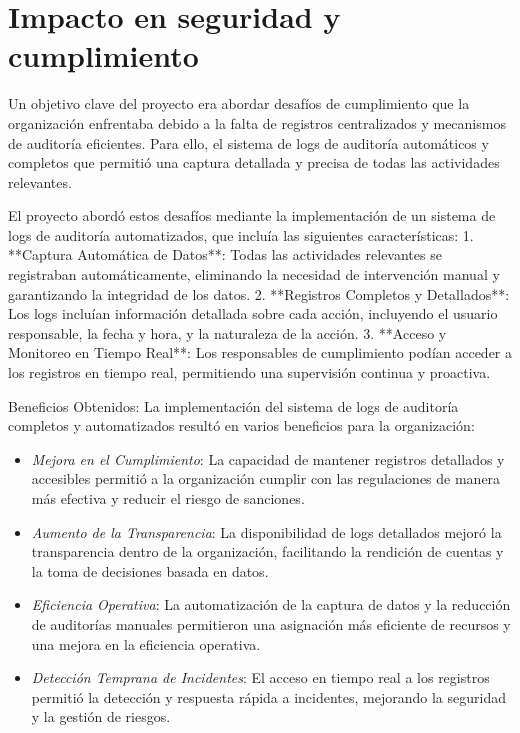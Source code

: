 \section{Impacto en seguridad y cumplimiento}

Un objetivo clave del proyecto era abordar desafíos de cumplimiento que la organización enfrentaba debido a la falta de registros centralizados y mecanismos de auditoría eficientes. Para ello, el sistema de logs de auditoría automáticos y completos que permitió una captura detallada y precisa de todas las actividades relevantes.

El proyecto abordó estos desafíos mediante la implementación de un sistema de logs de auditoría automatizados, que incluía las siguientes características:
1. **Captura Automática de Datos**: Todas las actividades relevantes se registraban automáticamente, eliminando la necesidad de intervención manual y garantizando la integridad de los datos.
2. **Registros Completos y Detallados**: Los logs incluían información detallada sobre cada acción, incluyendo el usuario responsable, la fecha y hora, y la naturaleza de la acción.
3. **Acceso y Monitoreo en Tiempo Real**: Los responsables de cumplimiento podían acceder a los registros en tiempo real, permitiendo una supervisión continua y proactiva.

Beneficios Obtenidos:
La implementación del sistema de logs de auditoría completos y automatizados resultó en varios beneficios para la organización:
\begin{itemize}
    \item \emph{Mejora en el Cumplimiento}: La capacidad de mantener registros detallados y accesibles permitió a la organización cumplir con las regulaciones de manera más efectiva y reducir el riesgo de sanciones.
    \item \emph{Aumento de la Transparencia}: La disponibilidad de logs detallados mejoró la transparencia dentro de la organización, facilitando la rendición de cuentas y la toma de decisiones basada en datos.
    \item \emph{Eficiencia Operativa}: La automatización de la captura de datos y la reducción de auditorías manuales permitieron una asignación más eficiente de recursos y una mejora en la eficiencia operativa.
    \item \emph{Detección Temprana de Incidentes}: El acceso en tiempo real a los registros permitió la detección y respuesta rápida a incidentes, mejorando la seguridad y la gestión de riesgos.
\end{itemize}

